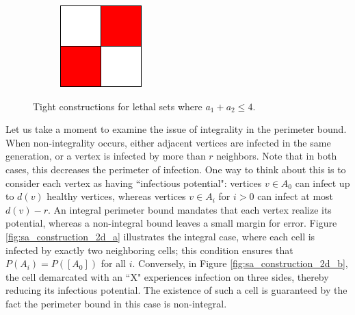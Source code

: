 \begin{figure}[]
\begin{subfigure}{0.1\textwidth}
\end{subfigure} \hfill%
\begin{subfigure}{0.06\textwidth}
	\includegraphics[width=\textwidth]{figures/1/2x2x1.pdf}
\end{subfigure}
\caption{Tight constructions for lethal sets where $a_1+a_2 \leq 4$.}
\label{fig:base_cases}
\end{figure} 

Let us take a moment to examine the issue of integrality in the perimeter bound. When non-integrality occurs, either adjacent vertices are infected in the same generation, or a vertex is infected by more than $r$ neighbors. Note that in both cases, this decreases the perimeter of infection. One way to think about this is to consider each vertex as having ``infectious potential": vertices $v \in A_0$ can infect up to $d(v)$ healthy vertices, whereas vertices $v \in A_i$ for $i > 0$ can infect at most $d(v) - r$. An integral perimeter bound mandates that each vertex realize its potential, whereas a non-integral bound leaves a small margin for error. Figure \ref{fig:sa_construction_2d_a} illustrates the integral case, where each cell is infected by exactly two neighboring cells; this condition ensures that $P(A_i) = P([A_0])$ for all $i$. Conversely, in Figure \ref{fig:sa_construction_2d_b}, the cell demarcated with an ``X" experiences infection on three sides, thereby reducing its infectious potential. The existence of such a cell is guaranteed by the fact the perimeter bound in this case is non-integral. 

